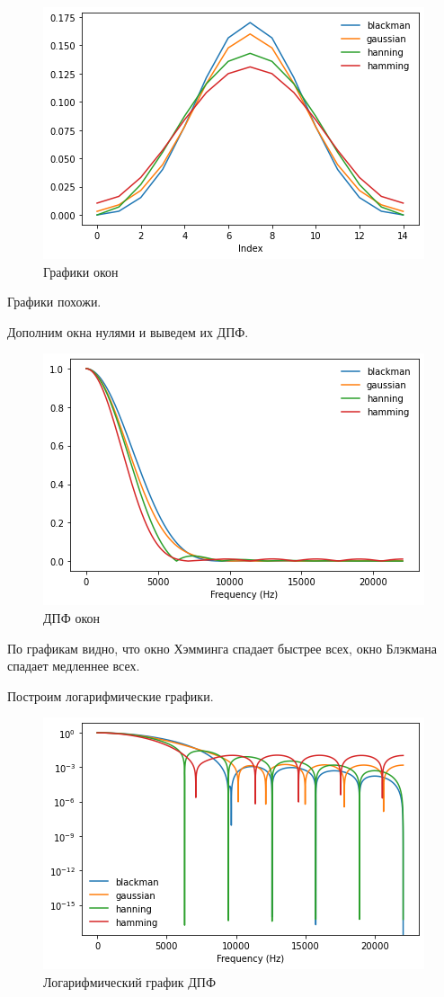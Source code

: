 \documentclass[a4paper, 14pt]{extarticle}
\begin{document}
    \begin{figure}[H]
        \centering
        \includegraphics[width=0.8\linewidth]{windows_wave}
        \caption{Графики окон}
        \label{fig:windows_wave}
    \end{figure}

    Графики похожи.

    Дополним окна нулями и выведем их ДПФ.

    \begin{figure}[H]
        \centering
        \includegraphics[width=0.8\linewidth]{windows_dtf}
        \caption{ДПФ окон}
        \label{fig:windows_dtf}
    \end{figure}

    По графикам видно, что окно Хэмминга спадает быстрее всех, окно Блэкмана спадает медленнее всех.

    Построим логарифмические графики.

    \begin{figure}[H]
        \centering
        \includegraphics[width=0.8\linewidth]{windows_log}
        \caption{Логарифмический график ДПФ}
        \label{fig:windows_log}
    \end{figure}
\end{document}
